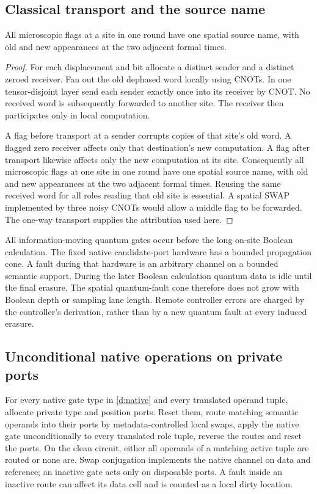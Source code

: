 \subsection{Classical transport and the source name}\label{s:source-name}
\begin{lemma}\label{d:transport-source}
All microscopic flags at a site in one round have one spatial source name, with old and new appearances at the two adjacent formal times.
\end{lemma}
\begin{proof}

For each displacement and bit allocate a distinct sender and a distinct
zeroed receiver. Fan out the old dephased word locally using CNOTs.
In one tensor-disjoint layer send each sender exactly once into its
receiver by CNOT. No received word is subsequently forwarded to another
site. The receiver then participates only in local computation.

A flag before transport at a sender corrupts copies of that site's
old word. A flagged zero receiver affects only that destination's new
computation. A flag after transport likewise affects only the new
computation at its site. Consequently all microscopic flags at one
site in one round have one spatial source name, with old and new
appearances at the two adjacent formal times. Reusing the same received
word for all roles reading that old site is essential. A spatial SWAP
implemented by three noisy CNOTs would allow a middle flag to be
forwarded. The one-way transport supplies the attribution used here.
\end{proof}

All information-moving quantum gates occur before the long on-site
Boolean calculation. The fixed native candidate-port
hardware has a bounded propagation cone. A fault during that hardware
is an arbitrary channel on a bounded semantic support. During the later
Boolean calculation quantum data is idle until the final erasure.
The spatial quantum-fault cone therefore does not grow with Boolean
depth or sampling lane length. Remote controller errors are charged by
the controller's derivation, rather than by a new quantum fault at
every induced erasure.

\subsection{Unconditional native operations on private ports}\label{d:dispatch}
For every native gate type in \eqref{d:native} and every translated
operand tuple, allocate private type and position ports. Reset them,
route matching semantic operands into their ports by metadata-controlled
local swaps, apply the native gate unconditionally to every translated
role tuple, reverse the routes and reset the ports. On the clean
circuit, either all operands of a matching active tuple are routed or
none are. Swap conjugation implements the native channel on data and
reference; an inactive gate acts only on disposable ports.
A fault inside an inactive route can affect its data cell and is counted
as a local dirty location.

